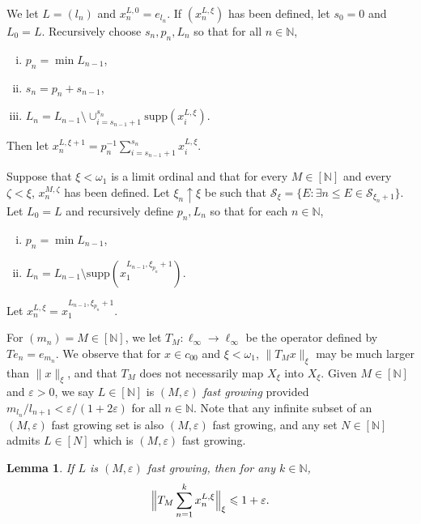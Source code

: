 \documentclass[12pt]{amsart}
\newtheorem{lemma}[theorem]{Lemma}
\theoremstyle{definition}
\newcommand{\infin}{[\mathbb{N}]}
\newcommand{\nn}{\mathbb{N}}
\newcommand{\sss}{\mathcal{S}}
\newcommand{\supp}{\mathrm{supp}}
\begin{document}
We let $L=(l_n)$ and $x_n^{L, 0}=e_{l_n}$.  If $(x_n^{L, \xi})$ has been defined, let $s_0=0$ and $L_0=L$.  Recursively choose $s_n, p_n, L_n$ so that for all $n\in \nn$, \begin{enumerate}[(i)]\item $p_n=\min L_{n-1}$, \item $s_n= p_n+s_{n-1}$, \item $L_n= L_{n-1}\setminus \cup_{i=s_{n-1}+1}^{s_n} \supp(x_i^{L, \xi})$. \end{enumerate} Then let $x_n^{L, \xi+1}=p_n^{-1}\sum_{i=s_{n-1}+1}^{s_n} x_i^{L, \xi}$.  

Suppose that $\xi<\omega_1$ is a limit ordinal and that for every $M\in \infin$ and every $\zeta<\xi$, $x_n^{M, \zeta}$ has been defined.  Let $\xi_n\uparrow \xi$ be such that $\sss_\xi=\{E:\exists n\leqslant E\in \sss_{\xi_n+1}\}$.  Let $L_0=L$ and recursively define $p_n, L_n$ so that for each $n\in \nn$, \begin{enumerate}[(i)]\item $p_n=\min L_{n-1}$, \item $L_n=L_{n-1}\setminus \supp(x_1^{L_{n-1}, \xi_{p_n}+1})$.     \end{enumerate} Let $x_n^{L, \xi}=x_1^{L_{n-1}, \xi_{p_n}+1}$.  


For $(m_n)=M\in \infin$, we let $T_M:\ell_\infty\to \ell_\infty$ be the operator defined by $Te_n= e_{m_n}$.  We observe that for $x\in c_{00}$ and $\xi<\omega_1$, $\|T_Mx\|_\xi$ may be much larger than $\|x\|_\xi$, and that $T_M$ does not necessarily map $X_\xi$ into $X_\xi$.  Given $M\in \infin$ and $\varepsilon>0$, we say $L\in \infin$ is $(M, \varepsilon)$ \emph{fast growing} provided $m_{l_n}/l_{n+1} < \varepsilon/(1+2\varepsilon)$ for all $n\in \nn$.  Note that any infinite subset of an $(M, \varepsilon)$ fast growing set is also $(M, \varepsilon)$ fast growing, and any set $N\in \infin$ admits $L\in [N]$ which is $(M, \varepsilon)$ fast growing.  


\begin{lemma} If $L$ is $(M, \varepsilon)$ fast growing, then for any $k\in \nn$, $$\Bigl\|T_M\sum_{n=1}^k x_n^{L, \xi}\Bigr\|_\xi \leqslant 1+\varepsilon.$$  

\label{repeated averages}

\end{lemma}
\end{document}
